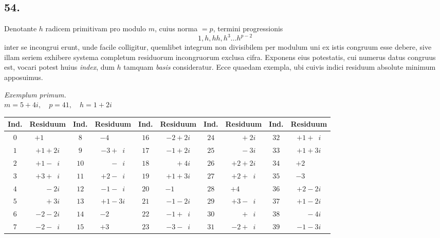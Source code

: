 \documentclass[twoside,12pt]{memoir}
\begin{document}
\subsection*{54.}
 
Denotante \(h\) radicem primitivam pro modulo \(m\), cuius norma \(=p\), termini progressionis
\[1, h, h h, h^{3} \ldots h^{p-2}\]
inter se incongrui erunt, unde facile colligitur, quemlibet integrum non divisibilem per modulum uni ex istis congruum esse debere, sive illam seriem exhibere systema completum residuorum incongruorum exclusa cifra. Exponens eius potestatis, cui numerus datus congruus est, vocari potest huius \textit{index}, dum \(h\) tamquam \textit{basis} consideratur. Ecce quaedam exempla, ubi cuivis indici residuum absolute minimum apposuimus.
\begin{center}
\textit{Exemplum primum.}\\
\(m=5+4 i, \quad p=41, \quad h=1+2 i\)\\
\begin{tabular}{c|c||c|c||c|c||c|c||c|c}
Ind. & Residuum & Ind. &Residuum & Ind. & Residuum & Ind. & Residuum & Ind. & Residuum \\
\hline
\(0\) & \(+1\phantom{\;+0i}\) & \(8\) & \(-4\phantom{\;+0i}\) & \(16 \)& \(-2+2 i\) & \(24\) & \(\phantom{+0}+2 i\) & \(32 \)& \(+1+\phantom{1}i\) \\
\(1\) & \(+1+2 i\) & \(9\) & \(-3+\phantom{1}i\) & \(17\) & \(-1+2 i\) & \(25\) & \(\phantom{+0}-3 i\) & \(33\) & \(+1+3 i\) \\
\(2\) & \(+1-\phantom{1}i\) & \(10\) & \(\phantom{+0}-\phantom{1}i\) & \(18\) & \(\phantom{+0}+4 i\) & \(26\) & \(+2+2 i\) & \(34\) & \(+2\phantom{\;+0i}\) \\
\(3\) & \(+3+\phantom{1}i\) & \(11\) & \(+2-\phantom{1}i\) & \(19\) & \(+1+3 i\) & \(27\) & \(+2+\phantom{1}i\) & \(35\) & \(-3\phantom{\;+0i}\)\\
\(4\) & \(\phantom{+0}-2 i\) & \(12\) & \(-1-\phantom{1}i\) & \(20\) & \(-1\phantom{\;+0i}\) & \(28\) & \(+4\phantom{\;+0i}\) & \(36\) & \(+2-2 i\) \\
\(5\) & \(\phantom{+0}+3 i\) & \(13\) & \(+1-3 i\) & \(21\) & \(-1-2 i\) & \(29\) & \(+3-\phantom{1}i\) & \(37\) & \(+1-2 i\) \\
\(6\) & \(-2-2 i\) & \(14\) & \(-2\phantom{\;+0i}\) & \(22\) & \(-1+\phantom{1}i\) & \(30\) & \(\phantom{+0}+\phantom{1}i\) & \(38\) & \(\phantom{+0}-4 i\) \\
\(7\) & \(-2-\phantom{1}i\) & \(15\) & \(+3\phantom{\;+0i}\) & \(23\) & \(-3-\phantom{1}i\) & \(31\) & \(-2+\phantom{1}i\) & \(39\) & \(-1-3 i\) \\
\end{tabular}\pagebreak%


\end{center}
\end{document}
